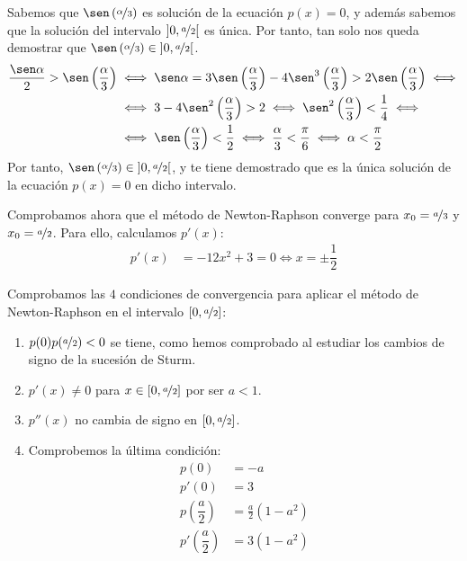 \begin{ejercicio}[DGIIM 2023/2024]
\begin{enumerate}
        Sabemos que $\sen\left(\nicefrac{\alpha}{3}\right)$ es solución de la ecuación $p(x) = 0$, y además sabemos que la solución del intervalo $\left]0,\nicefrac{a}{2}\right[$ es única. Por tanto, tan solo nos queda demostrar que $\sen\left(\nicefrac{\alpha}{3}\right)\in \left]0,\nicefrac{a}{2}\right[$.
        \begin{align*}
            \dfrac{\sen \alpha}{2}>\sen\left(\dfrac{\alpha}{3}\right)&\iff
            \sen\alpha = 3\sen\left(\dfrac{\alpha}{3}\right)-4\sen^3\left(\dfrac{\alpha}{3}\right)>2\sen\left(\dfrac{\alpha}{3}\right)\iff \\ &\iff
            3-4\sen^2\left(\dfrac{\alpha}{3}\right)>2\iff 
            \sen^2\left(\dfrac{\alpha}{3}\right)<\frac{1}{4}
            \iff \\ &\iff \sen\left(\dfrac{\alpha}{3}\right)<\frac{1}{2}
            \iff \frac{\alpha}{3}<\frac{\pi}{6}\iff \alpha<\frac{\pi}{2}
        \end{align*}
        Por tanto, $\sen\left(\nicefrac{\alpha}{3}\right)\in \left]0,\nicefrac{a}{2}\right[$, y te tiene demostrado que es la única solución de la ecuación $p(x) = 0$ en dicho intervalo.

        Comprobamos ahora que el método de Newton-Raphson converge para $x_0 = \nicefrac{a}{3}$ y $x_0 = \nicefrac{a}{2}$. Para ello, calculamos $p'(x)$:
        \begin{align*}
            p'(x) &= -12x^2 + 3=0\iff x=\pm \dfrac{1}{2}
        \end{align*}

        Comprobamos las $4$ condiciones de convergencia para aplicar el método de Newton-Raphson en el intervalo $\left[0,\nicefrac{a}{2}\right]$:
        \begin{enumerate}
            \item $p(0)p(\nicefrac{a}{2})<0$ se tiene, como hemos comprobado al estudiar los cambios de signo de la sucesión de Sturm.

            \item $p'(x)\neq 0$ para $x\in \left[0,\nicefrac{a}{2}\right]$ por ser $a<1$. 
            \item $p''(x)$ no cambia de signo en $\left[0,\nicefrac{a}{2}\right]$.
            \item Comprobemos la última condición:
            \begin{align*}
                p(0) &= -a\\
                p'(0) &= 3\\
                p\left(\dfrac{a}{2}\right) &= \frac{a}{2}(1-a^2)\\
                p'\left(\dfrac{a}{2}\right) &= 3(1-a^2)
            \end{align*}


\end{enumerate}
\end{enumerate}
\end{ejercicio}
